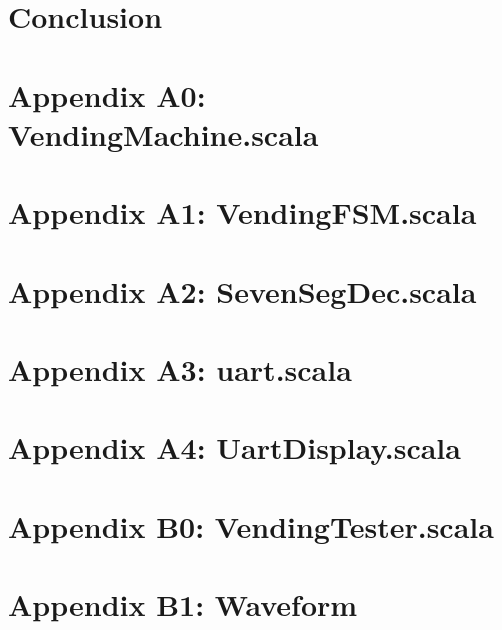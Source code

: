 \newpage
\section{Conclusion} \label{sec:con}



\newpage




\newpage
\appendix
{}
\setcounter{page}{1}

\label{sec:app_vending}
\section*{Appendix A0: VendingMachine.scala} 


\newpage
{}
\label{sec:app_fsm}
\section*{Appendix A1: VendingFSM.scala}


\newpage
{}
\label{sec:app_sevenseg}
\section*{Appendix A2: SevenSegDec.scala}


\newpage
{}
\label{sec:app_uart}
\section*{Appendix A3: uart.scala} 


\newpage
{}
\label{sec:app_uartdisplay}
\section*{Appendix A4: UartDisplay.scala}


\newpage
{}
\label{sec:app_tester}
\section*{Appendix B0: VendingTester.scala}


\newpage
{}
\label{sec:app_waveform}
\section*{Appendix B1: Waveform}



